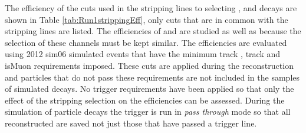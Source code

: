 The efficiency of the cuts used in the stripping lines to selecting \bmumu, \bhh and \bujpsik decays are shown in Table \ref{tab:Run1strippingEff}, only cuts that are in common with the \bmumu stripping lines are listed. The efficiencies of \bhh and \bujpsik are studied as well as \bmumu because the selection of these channels must be kept similar. The efficiencies are evaluated using 2012 sim06 simulated events that have the minimum track \pt, track \chisqd and isMuon requirements imposed. These cuts are applied during the reconstruction and particles that do not pass these requirements are not included in the samples of simulated decays. No trigger requirements have been applied so that only the effect of the stripping selection on the efficiencies can be assessed. During the simulation of particle decays the trigger is run in {\it pass through} mode so that all reconstructed are saved not just those that have passed a trigger line. 


